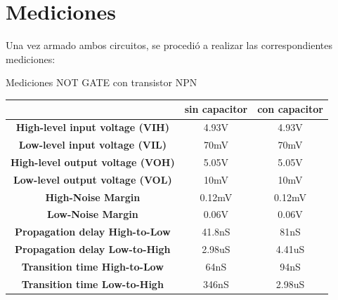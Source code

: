 \section{Mediciones}
Una vez armado ambos circuitos, se procedió a realizar las correspondientes mediciones:
\begin{center}
Mediciones NOT GATE con transistor NPN
	\begin{center}
		\begin{tabular}{|c|c|c|}
					\hline
					\textbf{} & \textbf{sin capacitor} & \textbf{con capacitor}\\
					\hline
					\textbf{High-level input voltage (VIH)} & 4.93V & 4.93V\\
					\hline
					\textbf{Low-level input voltage (VIL)} & 70mV & 	70mV\\
					\hline
					\textbf{High-level output voltage (VOH)} & 5.05V & 5.05V\\
					\hline
					\textbf{Low-level output voltage (VOL)} & 10mV & 10mV\\
					\hline
					\textbf{High-Noise Margin} & 0.12mV & 0.12mV\\
					\hline
					\textbf{Low-Noise Margin} & 0.06V & 0.06V\\
					\hline
					\textbf{Propagation delay High-to-Low} & 41.8nS & 81nS\\
					\hline
					\textbf{Propagation delay Low-to-High} & 2.98uS & 4.41uS\\
					\hline
					\textbf{Transition time High-to-Low} & 64nS & 94nS\\
					\hline
					\textbf{Transition time Low-to-High} & 346nS & 2.98uS\\
					\hline
				\end{tabular}
	\end{center}
\end{center}
